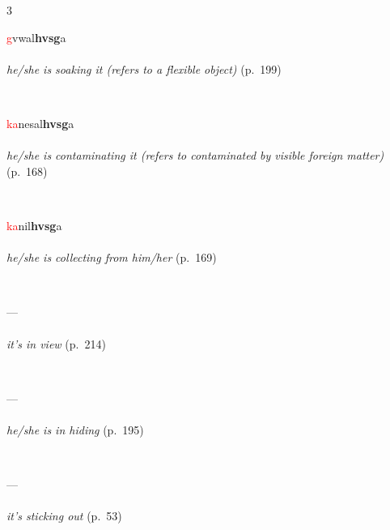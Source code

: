 \documentclass[oneside,openany]{book}%
\begin{document}
\begin{multicols}{3}
\begin{minipage}[t]{\linewidth}
\raggedright\noindent \textcolor{Red}{g}vwal\textbf{hvsg}a\\
\\
\noindent \textit{he/she is soaking it (refers to a flexible object)} (p.~199)
\end{minipage}\\[1em]%
\begin{minipage}[t]{\linewidth}
\raggedright\noindent \textcolor{Red}{ka}nesal\textbf{hvsg}a\\
\\
\noindent \textit{he/she is contaminating it (refers to contaminated by visible foreign matter)} (p.~168)
\end{minipage}\\[1em]%
\begin{minipage}[t]{\linewidth}
\raggedright\noindent \textcolor{Red}{ka}nil\textbf{hvsg}a\\
\\
\noindent \textit{he/she is collecting from him/her} (p.~169)
\end{minipage}\\[1em]%
\begin{minipage}[t]{\linewidth}
\raggedright\noindent ---\\
\\
\noindent \textit{it's in view} (p.~214)
\end{minipage}\\[1em]%
\begin{minipage}[t]{\linewidth}
\raggedright\noindent ---\\
\\
\noindent \textit{he/she is in hiding} (p.~195)
\end{minipage}\\[1em]%
\begin{minipage}[t]{\linewidth}
\raggedright\noindent ---\\
\\
\noindent \textit{it's sticking out} (p.~53)
\end{minipage}\\[1em]%
\end{multicols}%
\vspace{1em}%
\needspace{1.5in}%
\end{document}

